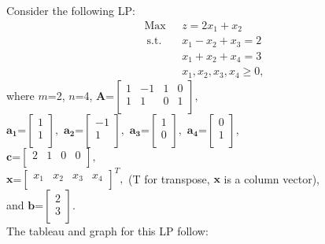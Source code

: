 \bigskip Consider the following LP:  
\begin{align*}
\mbox{Max~~} & z = 2x_1 + x_2  \\\
\mbox{s.t.~~} & x_1 - x_2 +x_3 =  2  \\
& x_1 + x_2 +x_4  = 3 \\
& x_1, x_2, x_3 , x_4  \ge 0,
\end{align*}
where $m$=2, $n$=4, $\mathbf{A}$=$\left[ \begin{array}{rrrr} 1 & -1 & 1 & 0 \\  1 &  1 &  0 & 1 \\ \end{array} \right],$ \\
$\mathbf{a_1}$=$ \left[ \begin{array}{c} 1  \\ 1  \\ \end{array} \right],$
$\mathbf{a_2}$=$\left[ \begin{array}{c} - 1  \\ 1  \\ \end{array} \right],$
$\mathbf{a_3}$=$\left[ \begin{array}{c} 1  \\ 0  \\ \end{array} \right],$
$\mathbf{a_4}$=$\left[ \begin{array}{c} 0  \\ 1  \\ \end{array} \right],$ \\
$\mathbf{c}$=$\left[ \begin{array}{rrrr} 2  & 1  & 0 & 0  \\ \end{array} \right],$ \\
$\mathbf{x}$=$\left[ \begin{array}{rrrr} x_1  & x_2  & x_3 & x_4  \\ \end{array} \right]^T,$ (T for transpose, $\mathbf{x}$ is a column vector), \\
and $\mathbf{b}$=$ \left[ \begin{array}{c} 2 \\ 3  \\ \end{array} \right].$\\

The tableau and graph for this LP follow:

